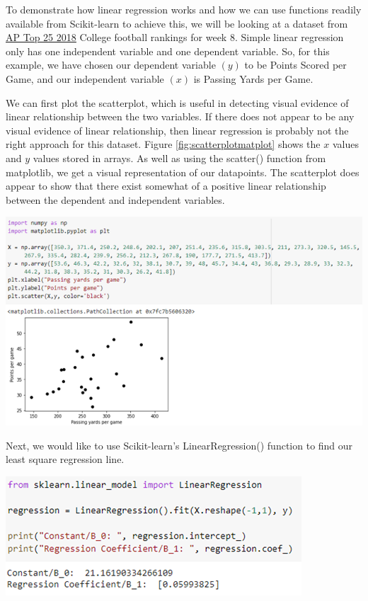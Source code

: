 \documentclass[a4paper,12pt]{report}
\newcommand{\link}[2]{\hyperlink{#1}{\underline{#2}}}
\begin{document}
To demonstrate how linear regression works and how we can use functions readily available from Scikit-learn to achieve this, we will be looking at a dataset from \link{http://www.espn.com/college-football/rankings}{AP Top 25 2018} College football rankings for week 8. Simple linear regression only has one independent variable and one dependent variable. So, for this example, we have chosen our dependent variable $(y)$ to be Points Scored per Game, and our independent variable $(x)$ is Passing Yards per Game.

We can first plot the scatterplot, which is useful in detecting visual evidence of linear relationship between the two variables. If there does not appear to be any visual evidence of linear relationship, then linear regression is probably not the right approach for this dataset. Figure \ref{fig:scatterplotmatplot} shows the $x$ values and $y$ values stored in arrays. As well as using the scatter() function from matplotlib, we get a visual representation of our datapoints. The scatterplot does appear to show that there exist somewhat of a positive linear relationship between the dependent and independent variables. 

\begin{center}
    \captionsetup{type=figure}
    \includegraphics[width=.9\linewidth]{media/scatterplotmatplot.png}
    \label{fig:scatterplotmatplot}
\end{center}

Next, we would like to use Scikit-learn’s LinearRegression() function to find our least square regression line.

\begin{center}
    \captionsetup{type=figure}
    \includegraphics[width=.9\linewidth]{media/sklearnregressionfit.png}
    \label{fig:sklearnregressionfit}
\end{center}
\end{document}
